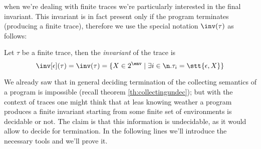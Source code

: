when we're dealing with finite traces we're particularly interested in
the final invariant. This invariant is in fact present only if the
program terminates (producing a finite trace), therefore we use the
special notation \(\inv(\tau)\) as follows:

\begin{notation}
  Let \(\tau\) be a finite trace, then the \emph{invariant} of the
  trace is \[\inv[\epsilon](\tau) = \inv(\tau) = \{ X \in 2^\env \mid
  \exists i \in\n . \tau_i = \stt{\epsilon,X}\}\]
\end{notation}

We already saw that in general deciding termination of the collecting
semantics of a program is impossible (recall theorem
\ref{th:collectingundec}); but with the context of traces one might
think that at leas knowing weather a program produces a finite
invariant starting from some finite set of environments is decidable
or not. The claim is that this information is undecidable, as it would
allow to decide for termination. In the following lines we'll
introduce the necessary tools and we'll prove it.
